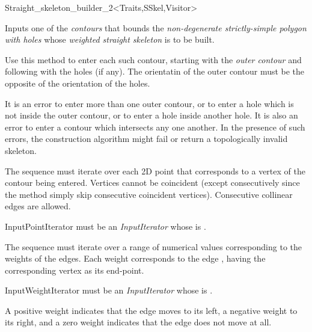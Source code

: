 \begin{ccRefClass}{Straight_skeleton_builder_2<Traits,SSkel,Visitor>}
{Inputs one of the \textit{contours} that bounds the \textit{non-degenerate strictly-simple polygon with holes} whose \textit{weighted straight skeleton} is to be built. 

Use this method to enter each such contour, starting with the \textit{outer contour} and following with the holes (if any). The orientatin of the outer contour must be the opposite of the orientation of the holes.

It is an error to enter more than one outer contour, or to enter a hole which is not inside the outer contour, or to enter a hole inside another hole. It is also an error to enter a contour
which intersects any one another. In the presence of such errors, the construction algorithm might fail or return a topologically invalid skeleton.

The sequence \ccc{[aPBegin,aPEnd)} must iterate over each 2D point that corresponds to a vertex of the contour being entered. Vertices cannot be coincident (except consecutively since the method simply skip consecutive coincident vertices). Consecutive collinear edges are allowed.

InputPointIterator must be an \textit{InputIterator} whose  is .

The sequence \ccc{[aWBegin,aWEnd)} must iterate over a range of numerical values corresponding to the weights of the edges.
Each weight  corresponds to the edge , having the corresponding vertex as its end-point.

InputWeightIterator must be an \textit{InputIterator} whose  is .

A positive weight indicates that the edge moves to its left, a negative weight to its right, and a zero weight indicates that the edge does not move at all. 

}
\end{ccRefClass}
